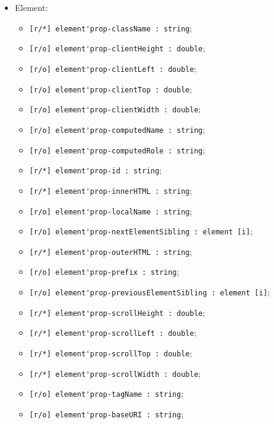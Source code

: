 \documentclass[a4paper, 14pt]{extarticle}
\newenvironment{icItems}
	{ \begin{itemize} [noitemsep,nolistsep] }
	{ \end{itemize} }
\begin{document}
\begin{icItems}
	\item Element:
	\begin{icItems}
		\item \lstinline|[r/*] element'prop-className : string|;
		\item \lstinline|[r/o] element'prop-clientHeight : double|;
		\item \lstinline|[r/o] element'prop-clientLeft : double|;
		\item \lstinline|[r/o] element'prop-clientTop : double|;
		\item \lstinline|[r/o] element'prop-clientWidth : double|;
		\item \lstinline|[r/o] element'prop-computedName : string|;
		\item \lstinline|[r/o] element'prop-computedRole : string|;
		\item \lstinline|[r/*] element'prop-id : string|;
		\item \lstinline|[r/*] element'prop-innerHTML : string|;
		\item \lstinline|[r/o] element'prop-localName : string|;
		\item \lstinline|[r/o] element'prop-nextElementSibling : element [i]|;
		\item \lstinline|[r/*] element'prop-outerHTML : string|;
		\item \lstinline|[r/o] element'prop-prefix : string|;
		\item \lstinline|[r/o] element'prop-previousElementSibling : element [i]|;
		\item \lstinline|[r/*] element'prop-scrollHeight : double|;
		\item \lstinline|[r/*] element'prop-scrollLeft : double|;
		\item \lstinline|[r/*] element'prop-scrollTop : double|;
		\item \lstinline|[r/*] element'prop-scrollWidth : double|;
		\item \lstinline|[r/o] element'prop-tagName : string|;
		\item \lstinline|[r/o] element'prop-baseURI : string|;
	\end{icItems}
	

\end{icItems}
\end{document}
